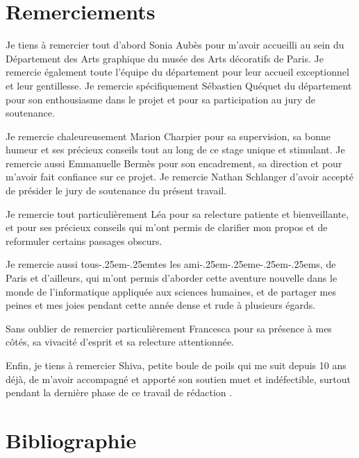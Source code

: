 \documentclass[12pt,twoside]{book}
\newcommand{\wokisme}{\kern-.25em\textperiodcentered\kern-.25em} %
\begin{document}
	\chapter{Remerciements}
    
Je tiens à remercier tout d'abord Sonia Aubès pour m'avoir accueilli au sein du Département des Arts graphique du musée des Arts décoratifs de Paris. Je remercie également toute l'équipe du département pour leur accueil exceptionnel et leur gentillesse. Je remercie spécifiquement Sébastien Quéquet du département pour son enthousiasme dans le projet et pour sa participation au jury de soutenance.

Je remercie chaleureusement Marion Charpier pour sa supervision, sa bonne humeur et ses précieux conseils tout au long de ce stage unique et stimulant. Je remercie aussi Emmanuelle Bermès pour son encadrement, sa direction et pour m'avoir fait confiance sur ce projet. Je remercie Nathan Schlanger d'avoir accepté de présider le jury de soutenance du présent travail.

Je remercie tout particulièrement Léa pour sa relecture patiente et bienveillante, et pour ses précieux conseils qui m'ont permis de clarifier mon propos et de reformuler certains passages obscurs. 

Je remercie aussi tous\wokisme tes les ami\wokisme e\wokisme s, de Paris et d'ailleurs, qui m'ont permis d'aborder cette aventure nouvelle dans le monde de l'informatique appliquée aux sciences humaines, et de partager mes peines et mes joies pendant cette année dense et rude à plusieurs égards. 

Sans oublier de remercier particulièrement Francesca pour sa présence à mes côtés, sa vivacité d'esprit et sa relecture attentionnée.

Enfin, je tiens à remercier Shiva, petite boule de poils qui me suit depuis 10 ans déjà, de m'avoir accompagné et apporté son soutien muet et indéfectible, surtout pendant la dernière phase de ce travail de rédaction .

        
\nocite{*}
\chapter{Bibliographie}
\section*{}
\end{document}
